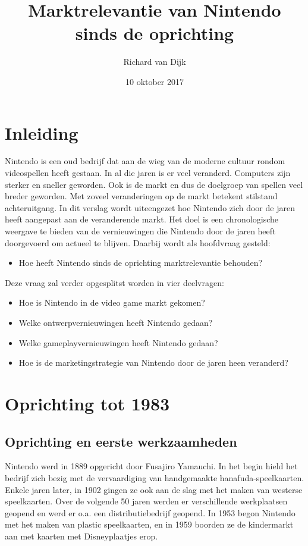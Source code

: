 \documentclass{article}
\title{Marktrelevantie van Nintendo sinds de oprichting}
\date{10 oktober 2017}
\author{Richard van Dijk}
\begin{document}
\maketitle
\newpage
\tableofcontents
\newpage



\setcounter{page}{1}
\section{Inleiding}

Nintendo is een oud bedrijf dat aan de wieg van de moderne cultuur rondom videospellen heeft gestaan. In al die jaren is er veel veranderd. Computers zijn sterker en sneller geworden. Ook is de markt en dus de doelgroep van spellen veel breder geworden. Met zoveel veranderingen op de markt betekent stilstand achteruitgang. In dit verslag wordt uiteengezet hoe Nintendo zich door de jaren heeft aangepast aan de veranderende markt. Het doel is een chronologische weergave te bieden van de vernieuwingen die Nintendo door de jaren heeft doorgevoerd om actueel te blijven. Daarbij wordt als hoofdvraag gesteld:
\begin{itemize} \item Hoe heeft Nintendo sinds de oprichting marktrelevantie behouden? \end{itemize}
Deze vraag zal verder opgesplitst worden in vier deelvragen:
\begin{itemize}
\item Hoe is Nintendo in de video game markt gekomen?
\item Welke ontwerpvernieuwingen heeft Nintendo gedaan?
\item Welke gameplayvernieuwingen heeft Nintendo gedaan?
\item Hoe is de marketingstrategie van Nintendo door de jaren heen veranderd?
\end{itemize}

\section{Oprichting tot 1983}
\subsection{Oprichting en eerste werkzaamheden}
Nintendo werd in 1889 opgericht door Fusajiro Yamauchi. In het begin hield het bedrijf zich bezig met de vervaardiging van handgemaakte hanafuda-speelkaarten. Enkele jaren later, in 1902 gingen ze ook aan de slag met het maken van westerse speelkaarten. Over de volgende 50 jaren werden er verschillende werkplaatsen geopend en werd er o.a. een distributiebedrijf geopend. In 1953 begon Nintendo met het maken van plastic speelkaarten, en in 1959 boorden ze de kindermarkt aan met kaarten met Disneyplaatjes erop. 
\end{document}
